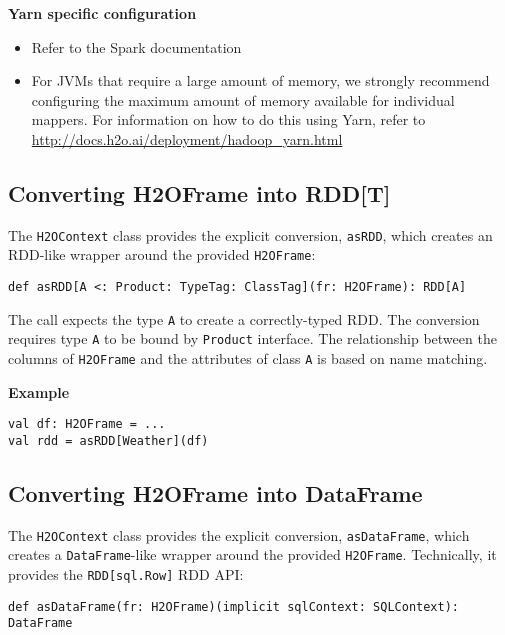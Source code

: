 \pagebreak
\textbf{Yarn specific configuration}

\begin{itemize}
\item Refer to the Spark documentation
\item For JVMs that require a large amount of memory, we strongly recommend configuring the maximum amount of memory available for individual mappers. For information on how to do this using Yarn, refer to {\url{http://docs.h2o.ai/deployment/hadoop_yarn.html}}
 \end{itemize} 
 
 \subsection{Converting H2OFrame into RDD[T]}
 
 The \texttt{H2OContext} class provides the explicit conversion, \texttt{asRDD}, which creates an RDD-like wrapper around the provided \texttt{H2OFrame}:

\begin{lstlisting}[style=Scala]
def asRDD[A <: Product: TypeTag: ClassTag](fr: H2OFrame): RDD[A]
\end{lstlisting}

The call expects the type \texttt{A} to create a correctly-typed RDD. The conversion requires type \texttt{A} to be bound by \texttt{Product} interface. The relationship between the columns of \texttt{H2OFrame} and the attributes of class \texttt{A} is based on name matching.

\textbf{Example}

\begin{lstlisting}[style=Scala]
val df: H2OFrame = ...
val rdd = asRDD[Weather](df)
\end{lstlisting}

\subsection{Converting H2OFrame into DataFrame}

The \texttt{H2OContext} class provides the explicit conversion, \texttt{asDataFrame}, which creates a \texttt{DataFrame}-like wrapper around the provided \texttt{H2OFrame}. Technically, it provides the \texttt{RDD[sql.Row]} RDD API:

\begin{lstlisting}[style=Scala]
def asDataFrame(fr: H2OFrame)(implicit sqlContext: SQLContext): DataFrame
\end{lstlisting}


